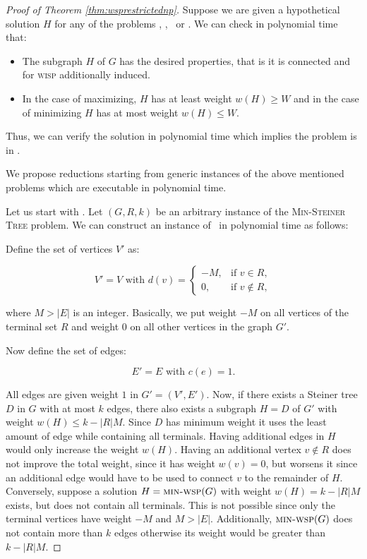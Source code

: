 \begin{proof}[Proof of Theorem \ref{thm:wsprestrictednp}]
	Suppose we are given a hypothetical solution $H$ for any of the problems \maxWSP, \minWSP, \maxWISP\ or \minWISP. We can check in polynomial time that:
	\begin{itemize}
		\item The subgraph $H$ of $G$ has the desired properties, that is it is connected and for \textsc{wisp} additionally induced.
		\item In the case of maximizing, $H$ has at least weight $w(H) \geq W$ and in the case of minimizing $H$ has at most weight $w(H) \leq W$.
	\end{itemize}
	Thus, we can verify the solution in polynomial time which implies the problem is in \NP.\medskip
	
	We propose reductions starting from generic instances of the above mentioned problems which are executable in polynomial time.\medskip
	
	Let us start with \minWSP. Let $(G,R,k)$ be an arbitrary instance of the \textsc{Min-Steiner Tree} problem. We can construct an instance of \minWSP\ in polynomial time as follows:\medskip
	
	Define the set of vertices $V'$ as:
	
	$$V' = V \text{ with } d(v) = 
	\begin{cases}
	-M,  & \text{if } v \in R,\\
	0,  & \text{if } v \notin R,
	\end{cases}$$
	
	where $M > |E|$ is an integer. Basically, we put weight $-M$ on all vertices of the terminal set $R$ and weight $0$ on all other vertices in the graph $G'$.\medskip
	
	Now define the set of edges:
	
	$$E' = E \text{ with } c(e) = 1.$$
	
	All edges are given weight $1$ in $G'=(V',E')$. Now, if there exists a Steiner tree $D$ in $G$ with at most $k$ edges, there also exists a subgraph $H=D$ of $G'$ with weight $w(H) \leq k - |R|M$. Since $D$ has minimum weight it uses the least amount of edge while containing all terminals. Having additional edges in $H$ would only increase the weight $w(H)$. Having an additional vertex $v \notin R$ does not improve the total weight, since it has weight $w(v) = 0$, but worsens it since an additional edge would have to be used to connect $v$ to the remainder of $H$. Conversely, suppose a solution $H = \text{\textsc{min-wsp}}(G)$ with weight $w(H) = k - |R|M$ exists, but does not contain all terminals. This is not possible since only the terminal vertices have weight $-M$ and $M > |E|$. Additionally, $\text{\textsc{min-wsp}}(G)$ does not contain more than $k$ edges otherwise its weight would be greater than $k - |R|M$.\medskip
	

\end{proof}
